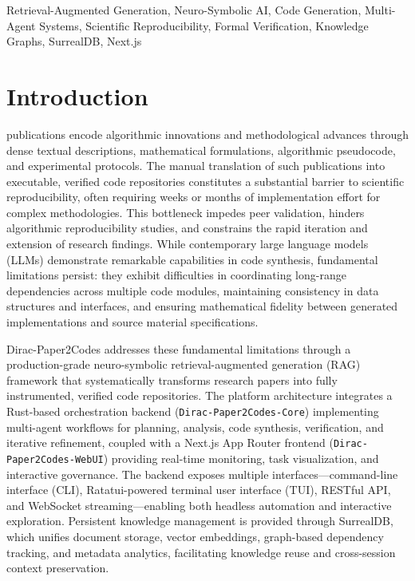 \documentclass{ieeeaccess}
\begin{document}
\begin{keywords}
Retrieval-Augmented Generation, Neuro-Symbolic AI, Code Generation, Multi-Agent Systems, Scientific Reproducibility, Formal Verification, Knowledge Graphs, SurrealDB, Next.js
\end{keywords}

\maketitle

\section{Introduction}\label{sec:introduction}

 publications encode algorithmic innovations and methodological advances through dense textual descriptions, mathematical formulations, algorithmic pseudocode, and experimental protocols. The manual translation of such publications into executable, verified code repositories constitutes a substantial barrier to scientific reproducibility, often requiring weeks or months of implementation effort for complex methodologies. This bottleneck impedes peer validation, hinders algorithmic reproducibility studies, and constrains the rapid iteration and extension of research findings. While contemporary large language models (LLMs) demonstrate remarkable capabilities in code synthesis, fundamental limitations persist: they exhibit difficulties in coordinating long-range dependencies across multiple code modules, maintaining consistency in data structures and interfaces, and ensuring mathematical fidelity between generated implementations and source material specifications.

Dirac-Paper2Codes addresses these fundamental limitations through a production-grade neuro-symbolic retrieval-augmented generation (RAG) framework that systematically transforms research papers into fully instrumented, verified code repositories. The platform architecture integrates a Rust-based orchestration backend (\texttt{Dirac-Paper2Codes-Core}) implementing multi-agent workflows for planning, analysis, code synthesis, verification, and iterative refinement, coupled with a Next.js App Router frontend (\texttt{Dirac-Paper2Codes-WebUI}) providing real-time monitoring, task visualization, and interactive governance. The backend exposes multiple interfaces---command-line interface (CLI), Ratatui-powered terminal user interface (TUI), RESTful API, and WebSocket streaming---enabling both headless automation and interactive exploration. Persistent knowledge management is provided through SurrealDB, which unifies document storage, vector embeddings, graph-based dependency tracking, and metadata analytics, facilitating knowledge reuse and cross-session context preservation.
\end{document}
